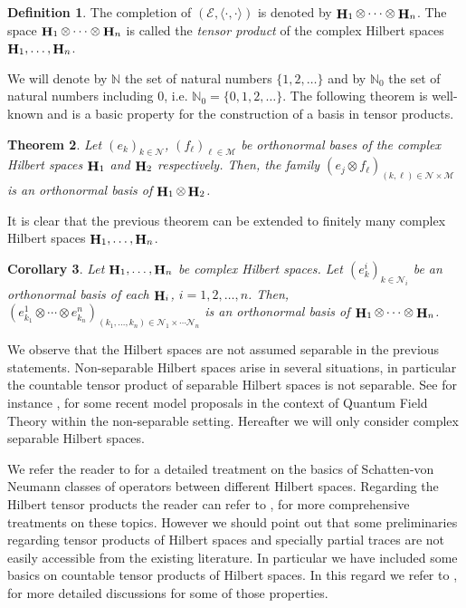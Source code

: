 \documentclass[a4paper,12pt,reqno]{amsart}
\newtheorem{thm}{Theorem}[section]
\newtheorem{cor}[thm]{Corollary}
\theoremstyle{definition}
\newtheorem{defn}[thm]{Definition}
\theoremstyle{remark}
\numberwithin{equation}{section}
\newcommand{\ene}{\mathbb{N}}
\DeclareMathOperator{\Hi}{{\bf H}}
\begin{document}
 
\begin{defn} The completion of $(\mathcal{E}, \langle \cdot, \cdot\rangle)$ is denoted by  $ \Hi_1\otimes\cdots \otimes \Hi_n$. 
	  The space $\Hi_1\otimes\cdots \otimes \Hi_n$ is called the {\em tensor product} of the  complex  Hilbert spaces $\Hi_1,\dots , \Hi_n$.
\end{defn}

We will denote by $\ene$ the set of natural numbers $\{1,2,\dots\}$ and by $\ene_0$ the set of natural numbers including $0$, i.e. $\ene_0 =\{0,1,2,\dots \}.$ The following theorem is well-known and is a basic property for the construction of a basis in tensor products.  
\begin{thm}\label{prhdes} Let $(e_k)_{k\in \mathcal{N}}$, $(f_{\ell})_{\ell\in \mathcal{M}}$ be orthonormal bases of the complex Hilbert spaces $\Hi_1$ and $\Hi_2$ respectively. Then, the family $(e_j\otimes f_{\ell})_{(k,\ell)\in\mathcal{N}\times \mathcal{M}}$ is an orthonormal basis of $\Hi_1\otimes\Hi_2$.
\end{thm}
It is clear that the previous theorem can be extended to finitely many complex Hilbert spaces  $\Hi_1,\dots , \Hi_n$.
\begin{cor}\label{prhdes33} Let $\Hi_1,\dots , \Hi_n$ be complex Hilbert spaces. Let $(e_k^i)_{k\in \mathcal{N}_i}$ be an orthonormal basis of each $\Hi_i$,  $i=1,2,\dots , n$. Then, $(e_{k_1}^1\otimes\cdots \otimes  e_{k_n}^n)_{(k_1,\dots ,k _n)\in\mathcal{N}_1\times\cdots \mathcal{N}_n}$ is an orthonormal basis of  $ \Hi_1\otimes\cdots \otimes \Hi_n$.
\end{cor}

We observe that the Hilbert spaces are not assumed separable in the previous statements. Non-separable Hilbert spaces arise in several situations,  in particular the countable tensor product of separable Hilbert spaces is not separable.  	
See for instance  \cite{gg:qq1}, \cite{gg:qq2} for some recent model proposals in the context of Quantum Field Theory within the non-separable setting. Hereafter we will only consider complex separable Hilbert spaces.
\medskip%
 
 
 We refer the reader to \cite{weid:b1} for a detailed treatment on the basics of Schatten-von Neumann classes of operators between different Hilbert spaces. Regarding the Hilbert tensor products
 the reader can refer to \cite{r-s:vol1}, \cite{prug:b1} for more comprehensive treatments on these topics. However we should point out that some preliminaries regarding tensor products of Hilbert spaces and specially partial traces are not easily accessible from the existing  literature. In particular we have included some basics on countable tensor products of Hilbert spaces.  
 In this regard we refer to \cite{gui:hi}, \cite{Pah:book} for more detailed discussions for some of those properties. 
\end{document}
